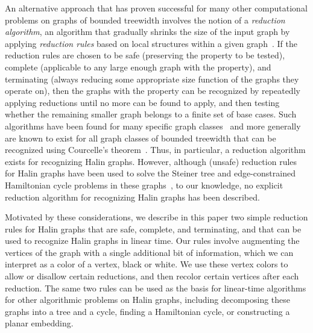 \documentclass{article}
\begin{document}
An alternative approach that has proven successful for many other computational problems on graphs of bounded treewidth involves the notion of a \emph{reduction algorithm}, an algorithm that gradually shrinks the size of the input graph by applying \emph{reduction rules} based on local structures within a given graph~\cite{Flu-PhD-97}. If the reduction rules are chosen to be safe (preserving the property to be tested), complete (applicable to any large enough graph with the property), and terminating (always reducing some appropriate size function of the graphs they operate on), then the graphs with the property can be recognized by repeatedly applying reductions until no more can be found to apply, and then testing whether the remaining smaller graph belongs to a finite set of base cases. Such algorithms have been found for many specific graph classes~\cite{Duf-JMAA-65,ValTarLaw-SJC-82,ArnPro-SJADM-86,BodThi-Algs-99} and more generally are known to exist for all graph classes of bounded treewidth that can be recognized using Courcelle's theorem~\cite{ArnCouPro-JACM-93,Flu-PhD-97}. Thus, in particular, a reduction algorithm exists for recognizing Halin graphs. However, although (unsafe) reduction rules for Halin graphs have been used to solve the Steiner tree and edge-constrained Hamiltonian cycle problems in these graphs~\cite{SkoSys-ZM-87,Win-DAM-87}, to our knowledge, no explicit reduction algorithm for recognizing Halin graphs has been described.

Motivated by these considerations, we describe in this paper two simple reduction rules for Halin graphs that are safe, complete, and terminating, and that can be used to recognize Halin graphs in linear time. Our rules involve augmenting the vertices of the graph with a single additional bit of information, which we can interpret as a color of a vertex, black or white. We use these vertex colors to allow or disallow certain reductions, and then recolor certain vertices after each reduction.
The same two rules can be used as the basis for linear-time algorithms for other algorithmic problems on Halin graphs, including decomposing these graphs into a tree and a cycle, finding a Hamiltonian cycle, or constructing a planar embedding.
\end{document}
